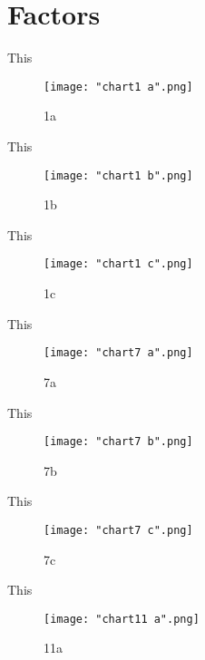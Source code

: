 \documentclass[12pt,letterpaper,oneside,titlepage]{article}
\begin{document}
\pagebreak
\section{Factors}
\par This
\begin{figure}[h]
	\centering
	\texttt{[image: "chart1 a".png]}
	\caption{1a}
\end{figure}
\pagebreak
\par This
\begin{figure}[h]
	\centering
	\texttt{[image: "chart1 b".png]}
	\caption{1b}
\end{figure}
\pagebreak
\par This
\begin{figure}[h]
	\centering
	\texttt{[image: "chart1 c".png]}
	\caption{1c}
\end{figure}
\pagebreak
\par This
\begin{figure}[h]
	\centering
	\texttt{[image: "chart7 a".png]}
	\caption{7a}
\end{figure}
\pagebreak
\par This
\begin{figure}[h]
	\centering
	\texttt{[image: "chart7 b".png]}
	\caption{7b}
\end{figure}
\pagebreak
\par This
\begin{figure}[h]
	\centering
	\texttt{[image: "chart7 c".png]}
	\caption{7c}
\end{figure}
\pagebreak
\par This
\begin{figure}[h]
	\centering
	\texttt{[image: "chart11 a".png]}
	\caption{11a}
\end{figure}
\pagebreak
\end{document}
